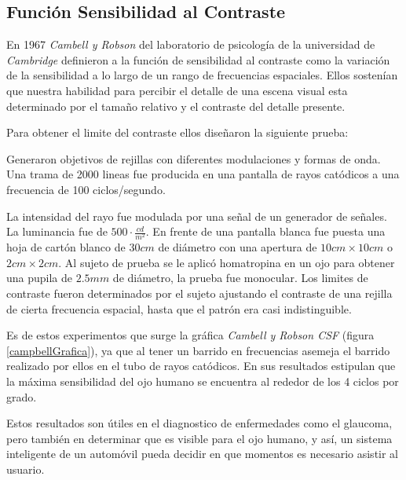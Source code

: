 \documentclass[conference]{IEEEtran}
\begin{document}
\subsection{Función Sensibilidad al Contraste}

En 1967 \textit{Cambell y Robson} del laboratorio de psicología  de la universidad de \textit{Cambridge}\cite{p5} definieron a la función de sensibilidad al contraste como la variación de la sensibilidad a lo largo de un rango de frecuencias espaciales. Ellos sostenían que nuestra habilidad para percibir el detalle de una escena visual esta determinado por el tamaño relativo y el contraste del detalle presente.

Para obtener el limite del contraste ellos diseñaron la siguiente prueba: 

Generaron objetivos de rejillas con diferentes modulaciones y formas de onda. Una  trama de 2000 lineas
fue producida en una pantalla de rayos catódicos a una frecuencia de 100 ciclos/segundo.

La intensidad del rayo fue modulada por una señal de un generador de señales. La luminancia fue de
$500\cdot \displaystyle\frac{cd}{m^2}$. En frente de una pantalla blanca fue puesta una hoja de cartón blanco de $30cm$ de diámetro con una apertura de $10cm \times 10cm$ o $2cm \times 2cm$. Al sujeto de prueba se le aplicó homatropina en un ojo para obtener una pupila de $2.5 mm$ de diámetro, la prueba fue monocular. Los limites de contraste fueron determinados por el sujeto ajustando el contraste de una rejilla de cierta frecuencia espacial, hasta que el patrón era casi indistinguible.

Es de estos experimentos que surge la gráfica \textit{Cambell y Robson CSF} (figura \ref{campbellGrafica}), ya que al tener un barrido en frecuencias  asemeja el barrido realizado por ellos en el tubo de rayos catódicos. En sus resultados estipulan que la máxima sensibilidad del ojo humano se encuentra al rededor de los 4 ciclos por grado.

Estos resultados son útiles en el diagnostico de enfermedades como el glaucoma\cite{p6}, pero también
en determinar que es visible para el ojo humano, y así, un sistema inteligente de un automóvil pueda decidir en que momentos es necesario asistir al usuario. 
\end{document}
